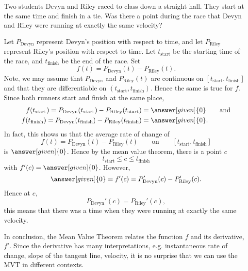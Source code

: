\documentclass{ximera}
\begin{document}
\begin{example}
  Two students Devyn and Riley raced to class down a straight hall. They start at the same time and finish in a tie. Was there a point
  during the race that Devyn and Riley were running at exactly the
  same velocity?
  \begin{explanation}
    Let $P_\mathrm{Devyn}$ represent Devyn's position with respect to
    time, and let $P_\mathrm{Riley}$ represent Riley's position with
    respect to time. Let $t_\mathrm{start}$ be the starting time of
    the race, and $t_\mathrm{finish}$ be the end of the race. Set
    \[
    f(t) =P_\mathrm{Devyn}(t)-P_\mathrm{Riley}(t).
    \]
    Note, we may assume that $P_\mathrm{Devyn}$ and
    $P_\mathrm{Riley}(t)$ are continuous on
    $[t_\mathrm{start},t_\mathrm{finish}]$ and that they are
    differentiable on $(t_\mathrm{start},t_\mathrm{finish})$. Hence
    the same is true for $f$. Since both runners start and finish at
    the same place,
    \begin{align*}
    f(t_\mathrm{start}) = P_\mathrm{Devyn}(t_\mathrm{start})-P_\mathrm{Riley}(t_\mathrm{start}) &= \answer[given]{0}\qquad\text{and}\\
    f(t_\mathrm{finish})=P_\mathrm{Devyn}(t_\mathrm{finish})-P_\mathrm{Riley}(t_\mathrm{finish}) &= \answer[given]{0}.\\
    \end{align*}
    In fact, this shows us that the average rate of change of
    \[
    f(t) = P_\mathrm{Devyn}(t)-P_\mathrm{Riley}(t)
    \qquad\text{on}\qquad [t_\mathrm{start},t_\mathrm{finish}]
    \]
    is $\answer[given]{0}$. Hence by the mean value theorem, there is a point $c$
    \[
    t_\mathrm{start}\le c \le t_{\mathrm{finish}}
    \]
    with $f'(c) = \answer[given]{0}$. However,
    \[
    \answer[given]{0} = f'(c) = P_\mathrm{Devyn}'(c)-P_\mathrm{Riley}'(c).
    \]
    Hence at $c$,
    \[
    P_\mathrm{Devyn}'(c)=P_\mathrm{Riley}'(c),
    \]
    this means that there was a time when they were running at exactly the same velocity.
  \end{explanation}
\end{example}

In conclusion, the Mean Value Theorem relates the function $f$ and its derivative, $f'$. Since the derivative has many interpretations, e.g. instantaneous rate of change, slope of the tangent line, velocity, it is no surprise that we can use the MVT in different contexts.
\end{document}
